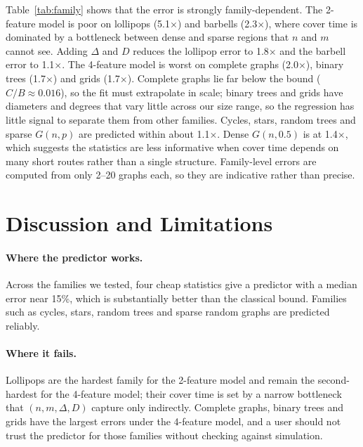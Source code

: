 \documentclass{article}
\begin{document}
Table~\ref{tab:family} shows that the error is strongly family-dependent. The 2-feature model is poor on lollipops (5.1$\times$) and barbells (2.3$\times$), where cover time is dominated by a bottleneck between dense and sparse regions that $n$ and $m$ cannot see. Adding $\Delta$ and $D$ reduces the lollipop error to 1.8$\times$ and the barbell error to 1.1$\times$. The 4-feature model is worst on complete graphs (2.0$\times$), binary trees (1.7$\times$) and grids (1.7$\times$). Complete graphs lie far below the bound ($\hat{C}/B\approx0.016$), so the fit must extrapolate in scale; binary trees and grids have diameters and degrees that vary little across our size range, so the regression has little signal to separate them from other families. Cycles, stars, random trees and sparse $G(n,p)$ are predicted within about 1.1$\times$. Dense $G(n,0.5)$ is at 1.4$\times$, which suggests the statistics are less informative when cover time depends on many short routes rather than a single structure. Family-level errors are computed from only 2--20 graphs each, so they are indicative rather than precise.

\section{Discussion and Limitations}
\label{sec:limits}

\paragraph{Where the predictor works.} Across the families we tested, four cheap statistics give a predictor with a median error near 15\%, which is substantially better than the classical bound. Families such as cycles, stars, random trees and sparse random graphs are predicted reliably.

\paragraph{Where it fails.} Lollipops are the hardest family for the 2-feature model and remain the second-hardest for the 4-feature model; their cover time is set by a narrow bottleneck that $(n,m,\Delta,D)$ capture only indirectly. Complete graphs, binary trees and grids have the largest errors under the 4-feature model, and a user should not trust the predictor for those families without checking against simulation.
\end{document}
